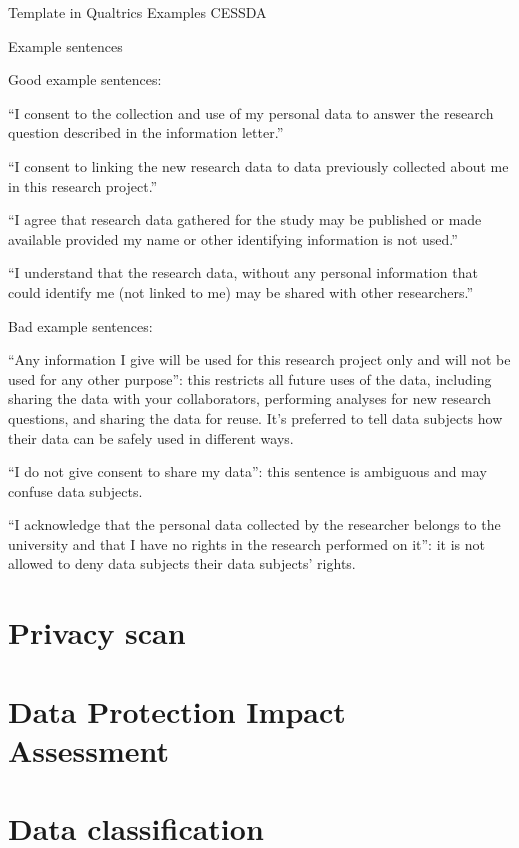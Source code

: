 \documentclass[
]{book}
\begin{document}
Template in Qualtrics
Examples CESSDA

Example sentences

Good example sentences:

``I consent to the collection and use of my personal data to answer the
research question described in the information letter.''

``I consent to linking the new research data to data previously collected
about me in this research project.''

``I agree that research data gathered for the study may be published or
made available provided my name or other identifying information is not used.''

``I understand that the research data, without any personal information
that could identify me (not linked to me) may be shared with other researchers.''

Bad example sentences:

``Any information I give will be used for this research project only and
will not be used for any other purpose'': this restricts all future uses of
the data, including sharing the data with your collaborators, performing
analyses for new research questions, and sharing the data for reuse. It's
preferred to tell data subjects how their data can be safely used in
different ways.

``I do not give consent to share my data'': this sentence is ambiguous and
may confuse data subjects.

``I acknowledge that the personal data collected by the researcher belongs
to the university and that I have no rights in the research performed on it'':
it is not allowed to deny data subjects their data subjects' rights.

\hypertarget{privacy-scan}{%
\section{Privacy scan}\label{privacy-scan}}

\hypertarget{dpia}{%
\section{Data Protection Impact Assessment}\label{dpia}}

\hypertarget{data-classification}{%
\section{Data classification}\label{data-classification}}
\end{document}
